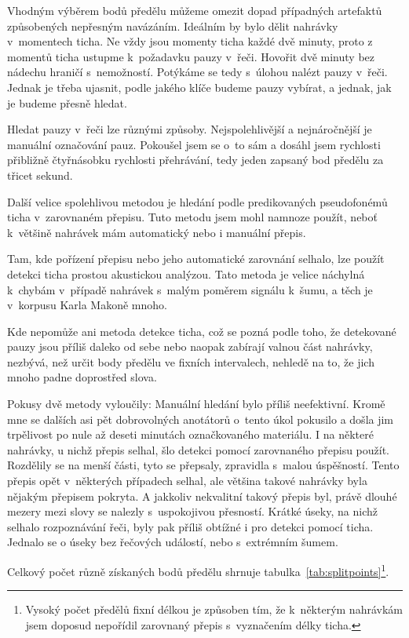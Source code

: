 Vhodným výběrem bodů předělu můžeme omezit dopad případných artefaktů
způsobených nepřesným navázáním. Ideálním by bylo dělit nahrávky v~momentech
ticha. Ne vždy jsou momenty ticha každé dvě minuty, proto z momentů ticha
ustupme k~požadavku pauzy v~řeči. Hovořit dvě minuty bez nádechu hraničí
s~nemožností. Potýkáme se tedy s~úlohou nalézt pauzy v~řeči. Jednak je třeba
ujasnit, podle jakého klíče budeme pauzy vybírat, a jednak, jak je budeme přesně
hledat.

Hledat pauzy v~řeči lze různými způsoby. Nejspolehlivější a nejnáročnější je
manuální označování pauz. Pokoušel jsem se o~to sám a dosáhl jsem rychlosti
přibližně čtyřnásobku rychlosti přehrávání, tedy jeden zapsaný bod předělu za
třicet sekund.

Další velice spolehlivou metodou je hledání podle predikovaných pseudofonémů
ticha v~zarovnaném přepisu. Tuto metodu jsem mohl namnoze použít, neboť
k~většině nahrávek mám automatický nebo i manuální přepis.

Tam, kde pořízení přepisu nebo jeho automatické zarovnání selhalo, lze použít
detekci ticha prostou akustickou analýzou. Tato metoda je velice náchylná
k~chybám v~případě nahrávek s~malým poměrem signálu k~šumu, a těch je v~korpusu
Karla Makoně mnoho.

Kde nepomůže ani metoda detekce ticha, což se pozná podle toho, že detekované
pauzy jsou příliš daleko od sebe nebo naopak zabírají valnou část nahrávky,
nezbývá, než určit body předělu ve fixních intervalech, nehledě na to, že jich
mnoho padne doprostřed slova.

Pokusy dvě metody vyloučily: Manuální hledání bylo příliš neefektivní. Kromě mne
se dalších asi pět dobrovolných anotátorů o~tento úkol pokusilo a došla jim
trpělivost po nule až deseti minutách označkovaného materiálu. I na některé
nahrávky, u nichž přepis selhal, šlo detekci pomocí
zarovnaného přepisu použít.
Rozdělily se na menší části, tyto se přepsaly, zpravidla
s~malou úspěšností. Tento přepis opět v~některých případech selhal, ale
většina takové nahrávky byla nějakým přepisem pokryta. A jakkoliv nekvalitní
takový přepis byl, právě dlouhé mezery mezi slovy se nalezly s~uspokojivou
přesností. Krátké úseky, na nichž selhalo rozpoznávání řeči, byly pak příliš
obtížné i pro detekci pomocí ticha. Jednalo se o úseky bez řečových událostí,
nebo s~extrémním šumem.


Celkový počet různě získaných bodů předělu shrnuje
tabulka~\ref{tab:splitpoints}\footnote{Vysoký počet předělů fixní délkou je způsoben tím, že
k~některým nahrávkám jsem doposud nepořídil zarovnaný přepis s~vyznačením délky
ticha.}.

